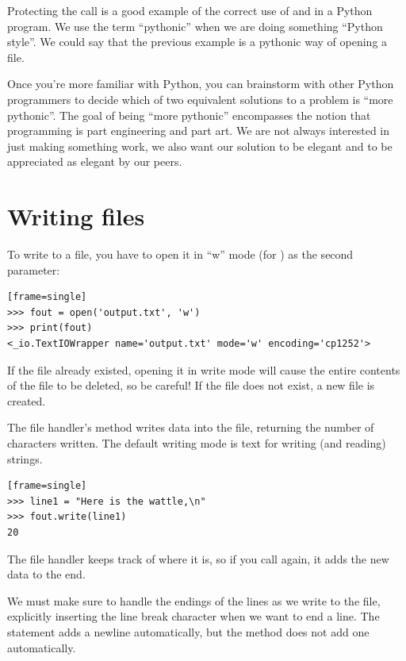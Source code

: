 Protecting the  call is a good example of the correct use of  and  in a Python program. We use the term ``pythonic'' when we are doing something ``Python style''. We could say that the previous example is a pythonic way of opening a file.

Once you're more familiar with Python, you can brainstorm with other Python programmers to decide which of two equivalent solutions to a problem is ``more pythonic''. The goal of being ``more pythonic'' encompasses the notion that programming is part engineering and part art. We are not always interested in just making something work, we also want our solution to be elegant and to be appreciated as elegant by our peers.

\hypertarget{escritura-de-ficheros}{%
\section{Writing files}\label{escritura-de-ficheros}}


To write to a file, you have to open it in ``w'' mode (for ) as the second parameter:

\begin{Verbatim}[frame=single][frame=single]
>>> fout = open('output.txt', 'w')
>>> print(fout)
<_io.TextIOWrapper name='output.txt' mode='w' encoding='cp1252'>
\end{Verbatim}

If the file already existed, opening it in write mode will cause the entire contents of the file to be deleted, so be careful! If the file does not exist, a new file is created.

The file handler's  method writes data into the file, returning the number of characters written. The default writing mode is text for writing (and reading) strings.

\begin{Verbatim}[frame=single][frame=single]
>>> line1 = "Here is the wattle,\n"
>>> fout.write(line1)
20
\end{Verbatim}


The file handler keeps track of where it is, so if you call  again, it adds the new data to the end.

We must make sure to handle the endings of the lines as we write to the file, explicitly inserting the line break character when we want to end a line. The  statement adds a newline automatically, but the  method does not add one automatically.

